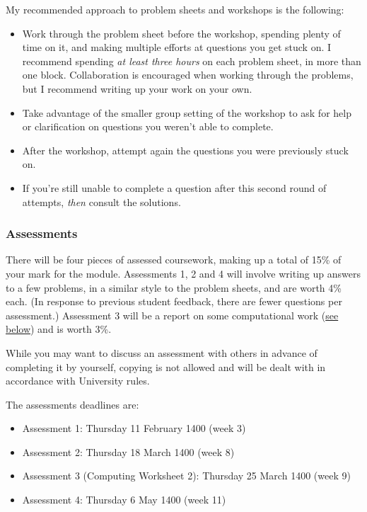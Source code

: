 \documentclass[
  a4paper,
]{article}
\providecommand{\tightlist}{%
  \setlength{\itemsep}{0pt}\setlength{\parskip}{0pt}}
\theoremstyle{definition}
\theoremstyle{definition}
\theoremstyle{definition}
\theoremstyle{remark}
\begin{document}
My recommended approach to problem sheets and workshops is the following:

\begin{itemize}
\tightlist
\item
  Work through the problem sheet before the workshop, spending plenty of time on it, and making multiple efforts at questions you get stuck on. I recommend spending \emph{at least three hours} on each problem sheet, in more than one block. Collaboration is encouraged when working through the problems, but I recommend writing up your work on your own.
\item
  Take advantage of the smaller group setting of the workshop to ask for help or clarification on questions you weren't able to complete.
\item
  After the workshop, attempt again the questions you were previously stuck on.
\item
  If you're still unable to complete a question after this second round of attempts, \emph{then} consult the solutions.
\end{itemize}

\hypertarget{assessments}{%
\subsubsection*{Assessments}\label{assessments}}

There will be four pieces of assessed coursework, making up a total of 15\% of your mark for the module. Assessments 1, 2 and 4 will involve writing up answers to a few problems, in a similar style to the problem sheets, and are worth 4\% each. (In response to previous student feedback, there are fewer questions per assessment.) Assessment 3 will be a report on some computational work (\protect\hyperlink{about--computing}{see below}) and is worth 3\%.

While you may want to discuss an assessment with others in advance of completing it by yourself, copying is not allowed and will be dealt with in accordance with University rules.

The assessments deadlines are:

\begin{itemize}
\tightlist
\item
  Assessment 1: Thursday 11 February 1400 (week 3)
\item
  Assessment 2: Thursday 18 March 1400 (week 8)
\item
  Assessment 3 (Computing Worksheet 2): Thursday 25 March 1400 (week 9)
\item
  Assessment 4: Thursday 6 May 1400 (week 11)
\end{itemize}
\end{document}
